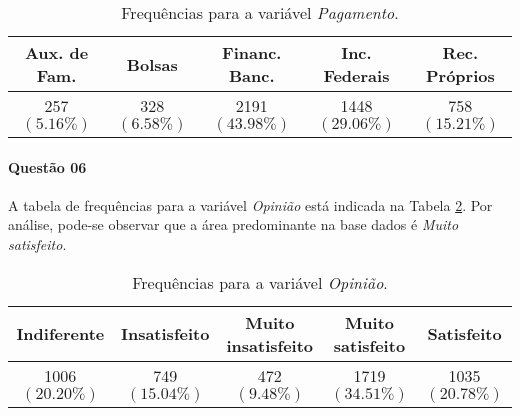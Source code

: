 \documentclass[10pt,a4paper,oneside]{article}
\begin{document}
\begin{table}[!h]
\centering
\begin{tabular}{c c c c c}
	\toprule
	\textbf{Aux. de Fam.}    & \textbf{Bolsas}   & \textbf{Financ. Banc.}  & \textbf{Inc. Federais} & \textbf{Rec. Próprios} \\
	\midrule
	257 $(5.16\%)$ & 328 $(6.58\%)$ & 2191 $(43.98\%)$ & 1448 $(29.06\%)$ & 758 $(15.21\%)$ \\
	\bottomrule
\end{tabular}
\caption{Frequências para a variável \textit{Pagamento}.}
\label{table:frequencias-pagamento}
\end{table}

\paragraph{Questão 06}

A tabela de frequências para a variável \textit{Opinião} está indicada na Tabela \ref{table:frequencias-opiniao}. Por análise, pode-se observar que a área predominante na base dados é \textit{Muito satisfeito}.

\begin{table}[!h]
\centering
\begin{tabular}{c c c c c}
	\toprule
	\textbf{Indiferente}    & \textbf{Insatisfeito}   & \textbf{Muito insatisfeito}  & \textbf{Muito satisfeito} & \textbf{Satisfeito} \\
	\midrule
	1006 $(20.20\%)$ & 749 $(15.04\%)$ & 472 $(9.48\%)$ & 1719 $(34.51\%)$ & 1035 $(20.78\%)$ \\
	\bottomrule
\end{tabular}
\caption{Frequências para a variável \textit{Opinião}.}
\label{table:frequencias-opiniao}
\end{table}
\end{document}
